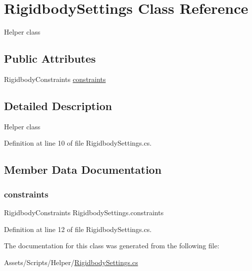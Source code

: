 \hypertarget{class_rigidbody_settings}{}\section{Rigidbody\+Settings Class Reference}
\label{class_rigidbody_settings}


Helper class  


\subsection*{Public Attributes}
\begin{DoxyCompactItemize}
\item 
Rigidbody\+Constraints \mbox{\hyperlink{class_rigidbody_settings_a874d1c83e52be266ab062aca4dad9e3c}{constraints}}
\end{DoxyCompactItemize}


\subsection{Detailed Description}
Helper class 



Definition at line 10 of file Rigidbody\+Settings.\+cs.



\subsection{Member Data Documentation}
\mbox{\label{class_rigidbody_settings_a874d1c83e52be266ab062aca4dad9e3c}} 
\subsubsection{\texorpdfstring{constraints}{constraints}}
{\footnotesize\ttfamily Rigidbody\+Constraints Rigidbody\+Settings.\+constraints}



Definition at line 12 of file Rigidbody\+Settings.\+cs.



The documentation for this class was generated from the following file\+:\begin{DoxyCompactItemize}
\item 
Assets/\+Scripts/\+Helper/\mbox{\hyperlink{_rigidbody_settings_8cs}{Rigidbody\+Settings.\+cs}}\end{DoxyCompactItemize}
